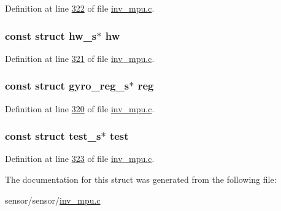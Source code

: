 Definition at line \hyperlink{inv__mpu_8c_source_l00322}{322} of file \hyperlink{inv__mpu_8c_source}{inv\+\_\+mpu.\+c}.

\subsubsection[{\texorpdfstring{hw}{hw}}]{\setlength{\rightskip}{0pt plus 5cm}const struct {\bf hw\+\_\+s}$\ast$ hw}\hypertarget{structgyro__state__s_a5bac30a96752691e4cc723735060e360}{}\label{structgyro__state__s_a5bac30a96752691e4cc723735060e360}


Definition at line \hyperlink{inv__mpu_8c_source_l00321}{321} of file \hyperlink{inv__mpu_8c_source}{inv\+\_\+mpu.\+c}.

\subsubsection[{\texorpdfstring{reg}{reg}}]{\setlength{\rightskip}{0pt plus 5cm}const struct {\bf gyro\+\_\+reg\+\_\+s}$\ast$ reg}\hypertarget{structgyro__state__s_ae857e1285c583b7438a208edd691a38e}{}\label{structgyro__state__s_ae857e1285c583b7438a208edd691a38e}


Definition at line \hyperlink{inv__mpu_8c_source_l00320}{320} of file \hyperlink{inv__mpu_8c_source}{inv\+\_\+mpu.\+c}.

\subsubsection[{\texorpdfstring{test}{test}}]{\setlength{\rightskip}{0pt plus 5cm}const struct {\bf test\+\_\+s}$\ast$ test}\hypertarget{structgyro__state__s_a4dc7fb069be996a5f40e25c01338a3ca}{}\label{structgyro__state__s_a4dc7fb069be996a5f40e25c01338a3ca}


Definition at line \hyperlink{inv__mpu_8c_source_l00323}{323} of file \hyperlink{inv__mpu_8c_source}{inv\+\_\+mpu.\+c}.



The documentation for this struct was generated from the following file\+:\begin{DoxyCompactItemize}
\item 
sensor/sensor/\hyperlink{inv__mpu_8c}{inv\+\_\+mpu.\+c}\end{DoxyCompactItemize}

